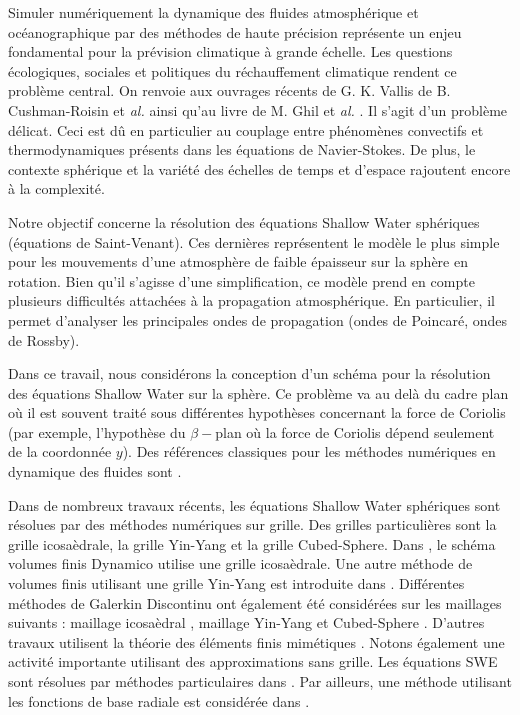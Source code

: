Simuler numériquement la dynamique des fluides atmosphérique et océanographique par des méthodes de haute précision représente un enjeu fondamental pour la prévision climatique à grande échelle. 
Les questions écologiques, sociales et politiques du réchauffement climatique rendent ce problème central. On renvoie aux ouvrages récents de G. K. Vallis \cite{Vallis2017} de B. Cushman-Roisin et \textit{al.} \cite{Cushman2011} ainsi qu'au livre de M. Ghil et \textit{al.} \cite{Ghil1987}. Il s'agit d'un problème délicat. Ceci est dû en particulier au couplage entre phénomènes convectifs et thermodynamiques présents dans les équations de Navier-Stokes. De plus, le contexte sphérique et la variété des échelles de temps et d'espace rajoutent encore à la complexité.

Notre objectif concerne la résolution des équations Shallow Water sphériques (équations de Saint-Venant). Ces dernières représentent le modèle le plus simple pour les mouvements d'une atmosphère de faible épaisseur sur la sphère en rotation. Bien qu'il s'agisse d'une simplification, ce modèle prend en compte plusieurs difficultés attachées à la propagation atmosphérique. En particulier, il permet d'analyser les principales ondes de propagation (ondes de Poincaré, ondes de Rossby).

Dans ce travail, nous considérons la conception d'un schéma pour la résolution des équations Shallow Water sur la sphère. Ce problème va au delà du cadre plan où il est souvent traité sous différentes hypothèses concernant la force de Coriolis (par exemple, l'hypothèse du $\beta-$plan où la force de Coriolis dépend seulement de la coordonnée $y$). Des références classiques pour les méthodes numériques en dynamique des fluides sont \cite{Augenbaum1985, Durran2013, Zeitlin2007}. 

Dans de nombreux travaux récents, les équations Shallow Water sphériques sont résolues par des méthodes numériques sur grille. Des grilles particulières sont la grille icosaèdrale, la grille Yin-Yang et la grille Cubed-Sphere. Dans \cite{Thuburn2014}, le schéma volumes finis Dynamico utilise une grille icosaèdrale. Une autre méthode de volumes finis utilisant une grille Yin-Yang est introduite dans \cite{Li2008}. Différentes méthodes de Galerkin Discontinu \cite{Lauter2008} ont également été considérées sur les maillages suivants : maillage icosaèdral \cite{Giraldo2002}, maillage Yin-Yang \cite{Hall2013} et Cubed-Sphere \cite{Kuang2016, Nair2005}. D'autres travaux utilisent la théorie des éléments finis mimétiques \cite{Eldred2015}. Notons également une activité importante utilisant des approximations sans grille. Les équations SWE sont résolues par méthodes particulaires dans \cite{Bosler2014}. Par ailleurs, une méthode utilisant les fonctions de base radiale est considérée dans \cite{Flyer2011, Fornberg2008}.  

